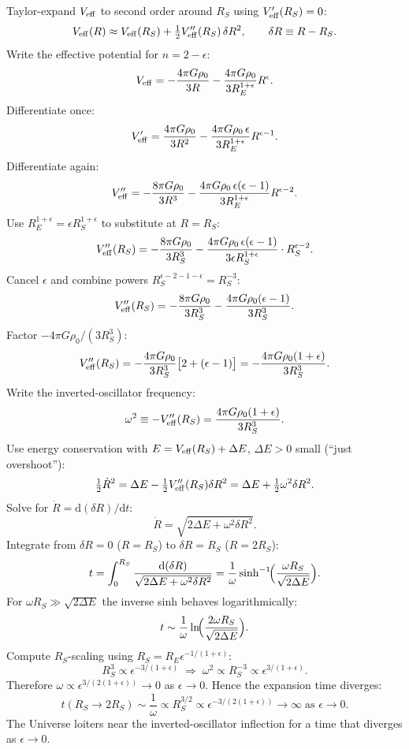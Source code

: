 \documentclass[11pt]{article}
\newcommand{\de}{\mathrm{d}}
\begin{document}
Taylor-expand $V_{\rm eff}$ to second order around $R_{S}$ using $V'_{\rm eff}(R_{S})=0$:
\[
V_{\rm eff}(R)\approx V_{\rm eff}(R_{S})+\tfrac{1}{2}V''_{\rm eff}(R_{S})\,\delta R^{2},\qquad \delta R\equiv R-R_{S}.
\]
Write the effective potential for $n=2-\epsilon$:
\[
V_{\rm eff}=-\frac{4\pi G\rho_{0}}{3R}-\frac{4\pi G\rho_{0}}{3R_{E}^{1+\epsilon}}R^{\epsilon}.
\]
Differentiate once:
\[
V'_{\rm eff}=\frac{4\pi G\rho_{0}}{3R^{2}}-\frac{4\pi G\rho_{0}\,\epsilon}{3R_{E}^{1+\epsilon}}R^{\epsilon-1}.
\]
Differentiate again:
\[
V''_{\rm eff}=-\frac{8\pi G\rho_{0}}{3R^{3}}-\frac{4\pi G\rho_{0}\,\epsilon(\epsilon-1)}{3R_{E}^{1+\epsilon}}R^{\epsilon-2}.
\]
Use $R_{E}^{1+\epsilon}=\epsilon R_{S}^{1+\epsilon}$ to substitute at $R=R_{S}$:
\[
V''_{\rm eff}(R_{S})=-\frac{8\pi G\rho_{0}}{3R_{S}^{3}}-\frac{4\pi G\rho_{0}\,\epsilon(\epsilon-1)}{3\epsilon R_{S}^{1+\epsilon}}\cdot R_{S}^{\epsilon-2}.
\]
Cancel $\epsilon$ and combine powers $R_{S}^{\epsilon-2-1-\epsilon}=R_{S}^{-3}$:
\[
V''_{\rm eff}(R_{S})=-\frac{8\pi G\rho_{0}}{3R_{S}^{3}}-\frac{4\pi G\rho_{0}(\epsilon-1)}{3R_{S}^{3}}.
\]
Factor $-4\pi G\rho_{0}/(3R_{S}^{3})$:
\[
V''_{\rm eff}(R_{S})=-\frac{4\pi G\rho_{0}}{3R_{S}^{3}}\bigl[2+(\epsilon-1)\bigr]=-\frac{4\pi G\rho_{0}(1+\epsilon)}{3R_{S}^{3}}.
\]
Write the inverted-oscillator frequency:
\[
\omega^{2}\equiv -V''_{\rm eff}(R_{S})=\frac{4\pi G\rho_{0}(1+\epsilon)}{3R_{S}^{3}}.
\]
Use energy conservation with $E=V_{\rm eff}(R_{S})+\Delta E$, $\Delta E>0$ small (``just overshoot''):
\[
\tfrac{1}{2}\dot R^{2}=\Delta E-\tfrac{1}{2}V''_{\rm eff}(R_{S})\delta R^{2}=\Delta E+\tfrac{1}{2}\omega^{2}\delta R^{2}.
\]
Solve for $\dot R=\de(\delta R)/\de t$:
\[
\dot R=\sqrt{2\Delta E+\omega^{2}\delta R^{2}}.
\]
Integrate from $\delta R=0$ ($R=R_{S}$) to $\delta R=R_{S}$ ($R=2R_{S}$):
\[
t=\int_{0}^{R_{S}}\frac{\de(\delta R)}{\sqrt{2\Delta E+\omega^{2}\delta R^{2}}}=\frac{1}{\omega}\sinh^{-1}\!\Bigl(\frac{\omega R_{S}}{\sqrt{2\Delta E}}\Bigr).
\]
For $\omega R_{S}\gg\sqrt{2\Delta E}$ the inverse sinh behaves logarithmically:
\[
t\sim \frac{1}{\omega}\ln\!\Bigl(\frac{2\omega R_{S}}{\sqrt{2\Delta E}}\Bigr).
\]
Compute $R_{S}$-scaling using $R_{S}=R_{E}\epsilon^{-1/(1+\epsilon)}$:
\[
R_{S}^{3}\propto \epsilon^{-3/(1+\epsilon)}\;\Rightarrow\; \omega^{2}\propto R_{S}^{-3}\propto \epsilon^{3/(1+\epsilon)}.
\]
Therefore $\omega\propto\epsilon^{3/(2(1+\epsilon))}\to 0$ as $\epsilon\to 0$.  Hence the expansion time diverges:
\begin{equation}
\boxed{\;t(R_{S}\to 2R_{S})\sim \frac{1}{\omega}\propto R_{S}^{3/2}\propto \epsilon^{-3/(2(1+\epsilon))}\to\infty\;\text{as }\epsilon\to 0.\;}
\label{eq:tdiv}
\end{equation}
The Universe loiters near the inverted-oscillator inflection for a time that diverges as $\epsilon\to 0$.
\end{document}
